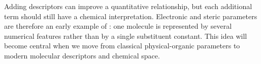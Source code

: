 Adding descriptors can improve a quantitative relationship, but each additional term should still have a chemical interpretation.
Electronic and steric parameters are therefore an early example of : one molecule is represented by several numerical features rather than by a single substituent constant.
This idea will become central when we move from classical physical-organic parameters to modern molecular descriptors and chemical space.
